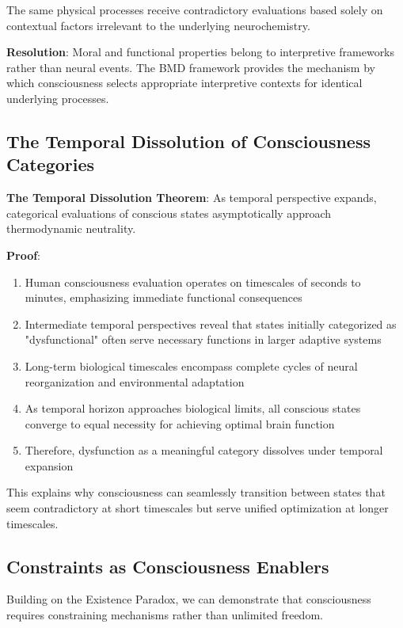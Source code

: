 \documentclass[12pt]{article}
\begin{document}
The same physical processes receive contradictory evaluations based solely on contextual factors irrelevant to the underlying neurochemistry.

\textbf{Resolution}: Moral and functional properties belong to interpretive frameworks rather than neural events. The BMD framework provides the mechanism by which consciousness selects appropriate interpretive contexts for identical underlying processes.

\subsection{The Temporal Dissolution of Consciousness Categories}

\textbf{The Temporal Dissolution Theorem}: As temporal perspective expands, categorical evaluations of conscious states asymptotically approach thermodynamic neutrality.

\textbf{Proof}:
\begin{enumerate}
\item Human consciousness evaluation operates on timescales of seconds to minutes, emphasizing immediate functional consequences
\item Intermediate temporal perspectives reveal that states initially categorized as "dysfunctional" often serve necessary functions in larger adaptive systems
\item Long-term biological timescales encompass complete cycles of neural reorganization and environmental adaptation
\item As temporal horizon approaches biological limits, all conscious states converge to equal necessity for achieving optimal brain function
\item Therefore, dysfunction as a meaningful category dissolves under temporal expansion
\end{enumerate}

This explains why consciousness can seamlessly transition between states that seem contradictory at short timescales but serve unified optimization at longer timescales.

\subsection{Constraints as Consciousness Enablers}

Building on the Existence Paradox, we can demonstrate that consciousness requires constraining mechanisms rather than unlimited freedom.
\end{document}

